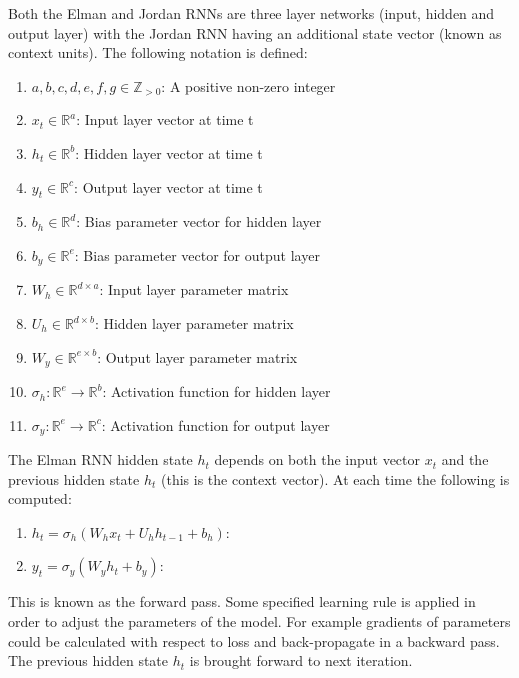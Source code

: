 \documentclass[conference]{IEEEtran}
\begin{document}
Both the Elman and Jordan RNNs are three layer networks (input, hidden and output layer) with the Jordan RNN having an additional state vector (known as context units). The following notation is defined:

\begin{enumerate}
	\item $a,b,c,d,e,f,g \in \mathbb{Z}_{>0}$: A positive non-zero integer
	
	\item $x_t \in \mathbb{R}^a$: Input layer vector at time t
	\item $h_t \in \mathbb{R}^b$: Hidden layer vector at time t
	\item $y_t \in \mathbb{R}^c$: Output layer vector at time t
	
	\item $b_h \in \mathbb{R}^{d}$: Bias parameter vector for hidden layer
	\item $b_y \in \mathbb{R}^{e}$: Bias parameter vector for output layer
	
	\item $W_h \in \mathbb{R}^{d \times a}$: Input layer parameter matrix
	\item $U_h \in \mathbb{R}^{d \times b}$: Hidden layer parameter matrix
	
	\item $W_y \in \mathbb{R}^{e \times b}$: Output layer parameter matrix
	
	
	\item $\sigma_h: \mathbb{R}^e \to \mathbb{R}^b $: Activation function for hidden layer
	\item $\sigma_y: \mathbb{R}^e \to \mathbb{R}^c $: Activation function for output layer
\end{enumerate}



The Elman RNN hidden state $h_t$ depends on both the input vector $x_t$ and the previous hidden state $h_t$ (this is the context vector). At each time the following is computed:

\begin{enumerate}
	\item $h_t = \sigma_h(W_h x_t + U_h h_{t-1} + b_h)$: 
	\item $y_t = \sigma_y(W_y h_t + b_y)$: 
\end{enumerate}

This is known as the forward pass. Some specified learning rule is applied in order to adjust the parameters of the model. For example gradients of parameters could be calculated with respect to loss and back-propagate in a backward pass. The previous hidden state $h_t$ is brought forward to next iteration.
\end{document}
